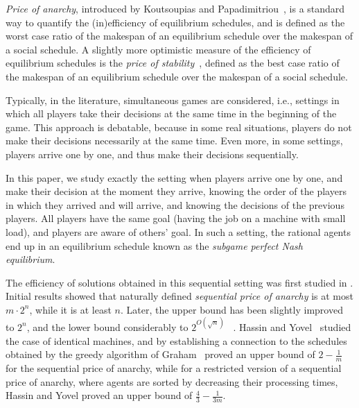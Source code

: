 \documentclass[runningheads]{llncs}
\begin{document}

\emph{Price of anarchy}, introduced by Koutsoupias and Papadimitriou~\cite{PoAoriginal}, is a standard way to quantify the (in)efficiency of equilibrium schedules, and is defined as the worst case ratio of the makespan of an equilibrium schedule over the makespan of a social schedule.
%
A slightly more optimistic measure of the efficiency of equilibrium schedules is the \emph{price of stability}~\cite{PoSoriginal}, defined as the best case ratio of the makespan of an equilibrium schedule over the makespan of a social schedule.
%

Typically, in the literature, simultaneous games are considered, i.e., settings in which all players take their decisions at the same time in the beginning of the game. 
%
This approach is debatable, because in some real situations, players do not make their decisions necessarily at the same time. Even more, in some settings, players arrive one by one, and thus make their decisions sequentially.
%

In this paper, we study exactly the setting when players arrive one by one, and make their decision at the moment they arrive, knowing the order of the players in which they arrived and will arrive, and knowing the decisions of the previous players.
%
All players have the same goal (having the job on a machine with small load), and players are aware of others' goal.
%
In such a setting, the rational agents end up in an equilibrium schedule known as the \emph{subgame perfect Nash equilibrium}.
%

The efficiency of solutions obtained in this sequential setting was first studied in \cite{originalSPOA}. Initial results showed that naturally defined \emph{sequential price of anarchy} is at most $m\cdot 2^n$, while it is at least $n$. Later, the upper bound has been slightly improved to $2^n$, and the lower bound considerably to $2^{O(\sqrt{n})}$~ \cite{bilo}. 
%
Hassin and Yovel~\cite{Hassin} studied the case of identical machines, and by establishing a connection to the schedules obtained by the greedy algorithm of Graham~\cite{Graham} proved an upper bound of $2-\frac{1}{m}$ for the sequential price of anarchy, while for a restricted version of a sequential price of anarchy, where agents are sorted by decreasing their processing times, Hassin and Yovel \cite{Hassin} proved an upper bound of $\frac{4}{3}-\frac{1}{3m}$.
\end{document}

